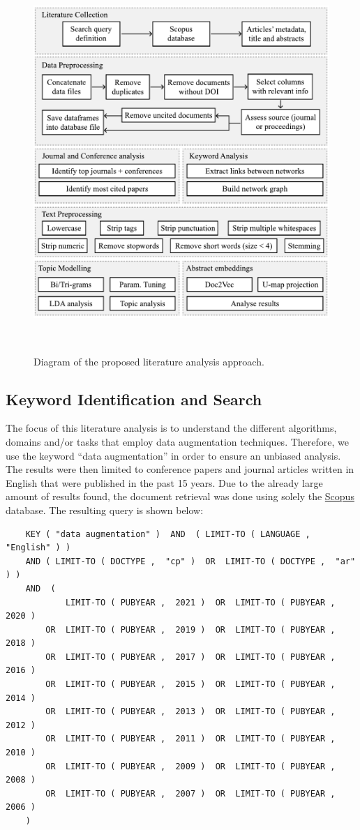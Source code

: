 \documentclass[parskip=full]{scrartcl}
\begin{document}
\begin{figure}[H]
	\centering
	\includegraphics[width=.75\linewidth]{../analysis/slr_diagram}
    \caption{Diagram of the proposed literature analysis approach.
    }~\label{fig:slr_diagram}
\end{figure}

\subsection{Keyword Identification and Search}

The focus of this literature analysis is to understand the different
algorithms, domains and/or tasks that employ data augmentation techniques.
Therefore, we use the keyword ``data augmentation'' in order to ensure an
unbiased analysis. The results were then limited to conference papers and
journal articles written in English that were published in the past 15 years.
Due to the already large amount of results found, the document retrieval was
done using solely the \href{https://www.scopus.com/}{Scopus} database. The
resulting query is shown below:

\begin{verbatim}
    KEY ( "data augmentation" )  AND  ( LIMIT-TO ( LANGUAGE ,  "English" ) )  
    AND ( LIMIT-TO ( DOCTYPE ,  "cp" )  OR  LIMIT-TO ( DOCTYPE ,  "ar" ) )  
    AND  (
            LIMIT-TO ( PUBYEAR ,  2021 )  OR  LIMIT-TO ( PUBYEAR ,  2020 )  
        OR  LIMIT-TO ( PUBYEAR ,  2019 )  OR  LIMIT-TO ( PUBYEAR ,  2018 )  
        OR  LIMIT-TO ( PUBYEAR ,  2017 )  OR  LIMIT-TO ( PUBYEAR ,  2016 )  
        OR  LIMIT-TO ( PUBYEAR ,  2015 )  OR  LIMIT-TO ( PUBYEAR ,  2014 )  
        OR  LIMIT-TO ( PUBYEAR ,  2013 )  OR  LIMIT-TO ( PUBYEAR ,  2012 )  
        OR  LIMIT-TO ( PUBYEAR ,  2011 )  OR  LIMIT-TO ( PUBYEAR ,  2010 )  
        OR  LIMIT-TO ( PUBYEAR ,  2009 )  OR  LIMIT-TO ( PUBYEAR ,  2008 )  
        OR  LIMIT-TO ( PUBYEAR ,  2007 )  OR  LIMIT-TO ( PUBYEAR ,  2006 ) 
    )  
\end{verbatim}
\end{document}
